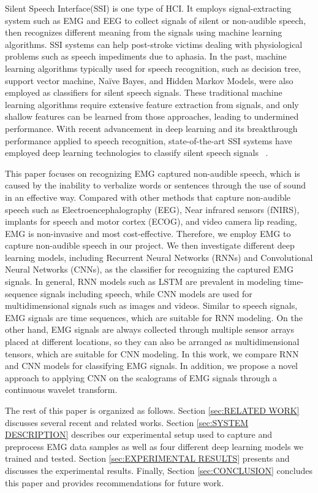 \documentclass{article}
\begin{document}
Silent Speech Interface(SSI) is one type of HCI. It employs signal-extracting system such as EMG and EEG to collect signals of silent or non-audible speech, then recognizes different meaning from the signals using machine learning algorithms. SSI systems can help post-stroke victims dealing with physiological problems such as speech impediments due to aphasia. In the past, machine learning algorithms typically used for speech recognition, such as decision tree, support vector machine, Naïve Bayes, and Hidden Markov Models, were also employed as classifiers for silent speech signals. These traditional machine learning algorithms require extensive feature extraction from signals, and only shallow features can be learned from those approaches, leading to undermined performance. With recent advancement in deep learning and its breakthrough performance applied to speech recognition, state-of-the-art SSI systems have employed deep learning  technologies to classify silent speech signals ~\cite{wang_deep_2017}.

This paper focuses on recognizing EMG captured non-audible speech, which is caused by the inability to verbalize words or sentences through the use of sound in an effective way. Compared with other methods that capture non-audible speech such as Electroencephalography (EEG), Near infrared sensors (fNIRS), implants for speech and motor cortex (ECOG), and video camera lip reading, EMG is non-invasive and most cost-effective. Therefore, we employ EMG to capture non-audible speech in our project. We then investigate different deep learning models, including Recurrent Neural Networks (RNNs) and Convolutional Neural Networks (CNNs), as the classifier for recognizing the captured EMG signals. In general, RNN models such as LSTM are prevalent in modeling time-sequence signals including speech, while CNN models are used for multidimensional signals such as images and videos. Similar to speech signals, EMG signals are time sequences, which are suitable for RNN modeling. On the other hand, EMG signals are always collected through multiple sensor arrays  placed at different locations, so they can also be arranged as multidimensional tensors, which are suitable for CNN modeling.  In this work, we compare RNN and CNN models for classifying EMG signals. In addition, we propose a novel approach to applying CNN on the scalograms of EMG signals through a continuous wavelet transform.  

The rest of this paper is organized as follows. Section \ref{sec:RELATED WORK} discusses several recent and related works. Section \ref{sec:SYSTEM DESCRIPTION} describes our experimental setup used to capture and preprocess EMG data samples as well as four different deep learning models we trained and tested. Section \ref{sec:EXPERIMENTAL RESULTS} presents and discusses the experimental results. Finally, Section \ref{sec:CONCLUSION} concludes this paper and provides recommendations for future work.
\end{document}
